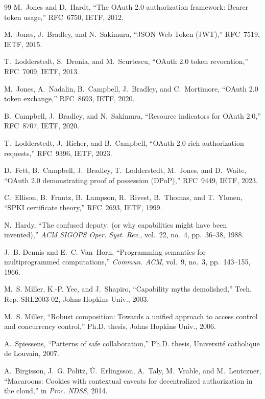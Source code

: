 \documentclass[conference]{IEEEtran}
\begin{document}
\begin{thebibliography}{99}
 M.~Jones and D.~Hardt, ``The OAuth 2.0 authorization framework: Bearer token usage,'' RFC~6750, IETF, 2012.

 M.~Jones, J.~Bradley, and N.~Sakimura, ``JSON Web Token (JWT),'' RFC~7519, IETF, 2015.

 T.~Lodderstedt, S.~Dronia, and M.~Scurtescu, ``OAuth 2.0 token revocation,'' RFC~7009, IETF, 2013.

 M.~Jones, A.~Nadalin, B.~Campbell, J.~Bradley, and C.~Mortimore, ``OAuth 2.0 token exchange,'' RFC~8693, IETF, 2020.

 B.~Campbell, J.~Bradley, and N.~Sakimura, ``Resource indicators for OAuth 2.0,'' RFC~8707, IETF, 2020.

 T.~Lodderstedt, J.~Richer, and B.~Campbell, ``OAuth 2.0 rich authorization requests,'' RFC~9396, IETF, 2023.

 D.~Fett, B.~Campbell, J.~Bradley, T.~Lodderstedt, M.~Jones, and D.~Waite, ``OAuth 2.0 demonstrating proof of possession (DPoP),'' RFC~9449, IETF, 2023.

 C.~Ellison, B.~Frantz, B.~Lampson, R.~Rivest, B.~Thomas, and T.~Ylonen, ``SPKI certificate theory,'' RFC~2693, IETF, 1999.

 N.~Hardy, ``The confused deputy: (or why capabilities might have been invented),'' \emph{ACM SIGOPS Oper. Syst. Rev.}, vol.~22, no.~4, pp.~36--38, 1988.

 J.~B. Dennis and E.~C. Van~Horn, ``Programming semantics for multiprogrammed computations,'' \emph{Commun. ACM}, vol.~9, no.~3, pp.~143--155, 1966.

 M.~S. Miller, K.-P. Yee, and J.~Shapiro, ``Capability myths demolished,'' Tech. Rep. SRL2003-02, Johns Hopkins Univ., 2003.

 M.~S. Miller, ``Robust composition: Towards a unified approach to access control and concurrency control,'' Ph.D. thesis, Johns Hopkins Univ., 2006.

 A.~Spiessens, ``Patterns of safe collaboration,'' Ph.D. thesis, Universit\'e catholique de Louvain, 2007.

 A.~Birgisson, J.~G. Politz, \'U.~Erlingsson, A.~Taly, M.~Vrable, and M.~Lentczner, ``Macaroons: Cookies with contextual caveats for decentralized authorization in the cloud,'' in \emph{Proc. NDSS}, 2014.


\end{thebibliography}
\end{document}
